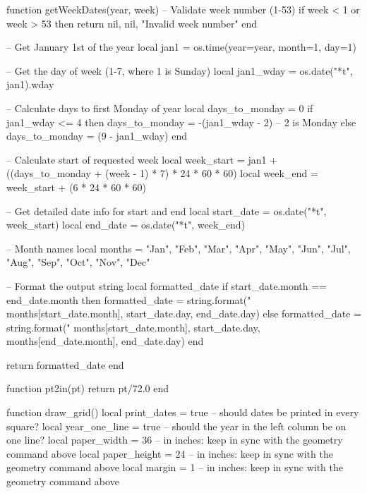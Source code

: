 \documentclass{article}
\begin{document}
\thispagestyle{empty}

\begin{luacode*}

function getWeekDates(year, week)
    -- Validate week number (1-53)
    if week < 1 or week > 53 then
        return nil, nil, "Invalid week number"
    end
    
    -- Get January 1st of the year
    local jan1 = os.time({year=year, month=1, day=1})
    
    -- Get the day of week (1-7, where 1 is Sunday)
    local jan1_wday = os.date("*t", jan1).wday
    
    -- Calculate days to first Monday of year
    local days_to_monday = 0
    if jan1_wday <= 4 then
        days_to_monday = -(jan1_wday - 2)  -- 2 is Monday
    else
        days_to_monday = (9 - jan1_wday)
    end
    
    -- Calculate start of requested week
    local week_start = jan1 + ((days_to_monday + (week - 1) * 7) * 24 * 60 * 60)
    local week_end = week_start + (6 * 24 * 60 * 60)
    
    -- Get detailed date info for start and end
    local start_date = os.date("*t", week_start)
    local end_date = os.date("*t", week_end)
    
    -- Month names
    local months = {
        "Jan", "Feb", "Mar", "Apr", "May", "Jun",
        "Jul", "Aug", "Sep", "Oct", "Nov", "Dec"
    }
    
    -- Format the output string
    local formatted_date
    if start_date.month == end_date.month then
        formatted_date = string.format("%
            months[start_date.month],
            start_date.day,
            end_date.day)
    else
        formatted_date = string.format("%
            months[start_date.month],
            start_date.day,
            months[end_date.month],
            end_date.day)
    end
    
    return formatted_date
end

function pt2in(pt)
  return pt/72.0
end

function draw_grid()
  local print_dates = true -- should dates be printed in every square?
  local year_one_line = true -- should the year in the left column be on one line?
  local paper_width = 36 -- in inches: keep in sync with the geometry command above
  local paper_height = 24 -- in inches: keep in sync with the geometry command above
  local margin = 1 -- in inches: keep in sync with the geometry command above


\end{luacode*}
\end{document}
